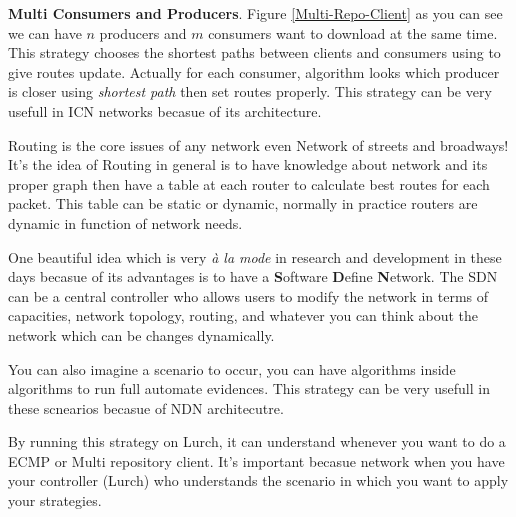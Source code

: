 \textbf{\Large{Multi Consumers and Producers}}. Figure \ref{Multi-Repo-Client} as you can see we can have $n$ producers and $m$ consumers want to download at the same time. This strategy chooses the shortest paths between clients and consumers using to give routes update. Actually for each consumer, algorithm looks which producer is closer using \textit{shortest path} then set routes properly. This strategy can be very usefull in ICN networks becasue of its architecture. 

Routing is the core issues of any network even Network of streets and broadways! It's the idea of Routing in general is to have knowledge about network and its proper graph then have a table at each router to calculate best routes for each packet. This table can be static or dynamic, normally in practice routers are dynamic in function of network needs. 

One beautiful idea which is very \textit{à la mode} in research and development in these days becasue of its advantages is to have a \textbf{S}oftware \textbf{D}efine \textbf{N}etwork. The SDN can be a central controller who allows users to modify the network in terms of capacities, network topology, routing, and whatever you can think about the network which can be changes dynamically.

You can also imagine a scenario to occur, you can have algorithms inside algorithms to run full automate evidences. This strategy can be very usefull in these scnearios becasue of NDN architecutre.

By running this strategy on Lurch, it can understand whenever you want to do a ECMP or Multi repository client. It's important becasue network when you have your controller (Lurch) who understands the scenario in which you want to apply your strategies. 

  


